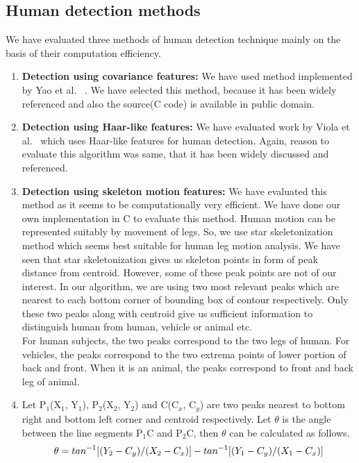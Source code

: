 \subsection{Human detection methods}
\indent We have evaluated three methods of human detection technique mainly on the
basis of their computation efficiency.
\begin{enumerate}
\item \textbf{Detection using covariance features:} We have used method
	implemented by Yao et al. ~\cite{19}. We have selected this
	method, because it has been widely referenced and also the
	source(C code) is available in public domain.
\item \textbf{Detection using Haar-like features:} We have evaluated
	work by Viola et al.~\cite{16, 17} which uses Haar-like
	features for human detection. Again, reason to evaluate this
	algorithm was same, that it has been widely discussed and
	referenced.
\item \textbf{Detection using skeleton motion features:} We have
	evaluated this method as it seems to be computationally very
	efficient.  We have done our own implementation in C to evaluate
	this method.  Human motion can be represented suitably by
	movement of legs. So, we use star skeletonization method which
	seems best suitable for human leg motion analysis. We have seen
	that star skeletonization gives us skeleton points in form of peak
	distance from centroid. However, some of these peak points are
	not of our interest. In our algorithm, we are using two most relevant
	peaks which are nearest to each bottom corner of bounding box of
	contour respectively. Only these two peaks along with centroid
	give us sufficient information to distinguish human from
	human, vehicle or animal etc.\\
\indent For human subjects, the two peaks correspond to the two legs of
human. For vehicles, the peaks correspond to the two extrema points of
lower portion of back and front.  When it is an animal, the peaks
correspond to front and back leg of animal.\\
\item Let P$_1$(X$_1$, Y$_1$), P$_2$(X$_2$, Y$_2$) and C(C$_x$, C$_y$)
are two peaks nearest to bottom right and bottom left corner and
centroid respectively. Let $\theta$ is the angle between the line
segments P$_1$C and P$_2$C, then $\theta$ can be calculated as
follows.\\
%
	\begin{equation}
	\theta = tan^{-1}[(Y_2 - C_y) / (X_2 - C_x)] \\ - tan^{-1}[(Y_1 - C_y) / (X_1 - C_x)]

\end{equation}
\end{enumerate}
